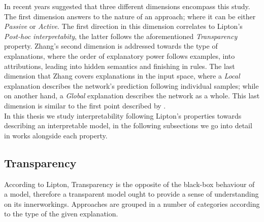 In recent years \cite{zhang2021survey} suggested that three different dimensions encompass this 
study. The first dimension answers to the nature of an approach; where it can be either 
\emph{Passive} or \emph{Active}. The first direction in this dimension correlates to Lipton's 
\emph{Post-hoc interpretabity}, the latter follows the aforementioned \emph{Transparency} property.
Zhang's second dimension is addressed towards the type of explanations, where the order of 
explanatory power follows examples, into attributions, leading into hidden semantics and 
finishing in rules. The last dimension that Zhang covers explanations in the input space, 
where a \emph{Local} explanation describes the network's prediction following individual 
samples; while on another hand, a \emph{Global} explanation describes the network as a whole. This 
last dimension is similar to the first point described by \cite{guidotti2018survey}.\\

\noindent In this thesis we study interpretability following Lipton's properties towards describing 
an interpretable model, in the following subsections we go into detail in works alongside each 
property.


\subsection{Transparency}
\label{rel:sub_transp}
According to Lipton, Transparency is the opposite of the black-box behaviour of a model, therefore 
a transparent model ought to provide a sense of understanding on its innerworkings. 
Approaches are grouped in a number of categories according to the type of the given explanation. \\

